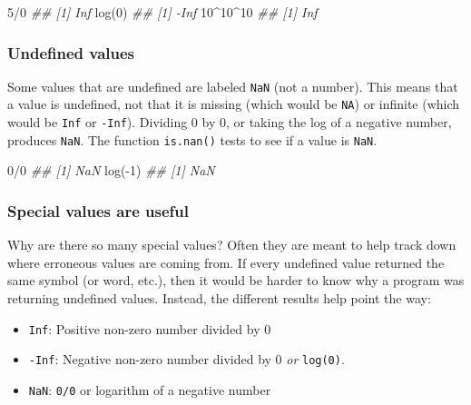 \documentclass[
  13,
  letterpaper,
]{report}
\newenvironment{Shaded}{\begin{snugshade}}{\end{snugshade}}
\newcommand{\DecValTok}[1]{\textcolor[rgb]{0.68,0.00,0.00}{#1}}
\newcommand{\DocumentationTok}[1]{\textcolor[rgb]{0.37,0.37,0.37}{\textit{#1}}}
\newcommand{\FunctionTok}[1]{\textcolor[rgb]{0.28,0.35,0.67}{#1}}
\newcommand{\NormalTok}[1]{\textcolor[rgb]{0.00,0.23,0.31}{#1}}
\newcommand{\SpecialCharTok}[1]{\textcolor[rgb]{0.37,0.37,0.37}{#1}}
\providecommand{\tightlist}{%
  \setlength{\itemsep}{0pt}\setlength{\parskip}{0pt}}
\begin{document}
\begin{Shaded}
\begin{Highlighting}[]
\DecValTok{5}\SpecialCharTok{/}\DecValTok{0}
\DocumentationTok{\#\# [1] Inf}
\FunctionTok{log}\NormalTok{(}\DecValTok{0}\NormalTok{)}
\DocumentationTok{\#\# [1] {-}Inf}
\DecValTok{10}\SpecialCharTok{\^{}}\DecValTok{10}\SpecialCharTok{\^{}}\DecValTok{10}
\DocumentationTok{\#\# [1] Inf}
\end{Highlighting}
\end{Shaded}

\subsubsection{Undefined values}\label{sec-03-type-spec-nan}

Some values that are undefined are labeled \texttt{NaN} (not a number).
This means that a value is undefined, not that it is missing (which
would be \texttt{NA}) or infinite (which would be \texttt{Inf} or
\texttt{-Inf}). Dividing 0 by 0, or taking the log of a negative number,
produces \texttt{NaN}. The function \texttt{is.nan()} tests to see if a
value is \texttt{NaN}.

\begin{Shaded}
\begin{Highlighting}[]
\DecValTok{0}\SpecialCharTok{/}\DecValTok{0}
\DocumentationTok{\#\# [1] NaN}
\FunctionTok{log}\NormalTok{(}\SpecialCharTok{{-}}\DecValTok{1}\NormalTok{)}
\DocumentationTok{\#\# [1] NaN}
\end{Highlighting}
\end{Shaded}

\subsubsection{Special values are useful}\label{sec-03-type-spec-why}

Why are there so many special values? Often they are meant to help track
down where erroneous values are coming from. If every undefined value
returned the same symbol (or word, etc.), then it would be harder to
know why a program was returning undefined values. Instead, the
different results help point the way:

\begin{itemize}
\tightlist
\item
  \texttt{Inf}: Positive non-zero number divided by 0
\item
  \texttt{-Inf}: Negative non-zero number divided by 0 \emph{or}
  \texttt{log(0)}.
\item
  \texttt{NaN}: \texttt{0/0} or logarithm of a negative number
\end{itemize}
\end{document}
